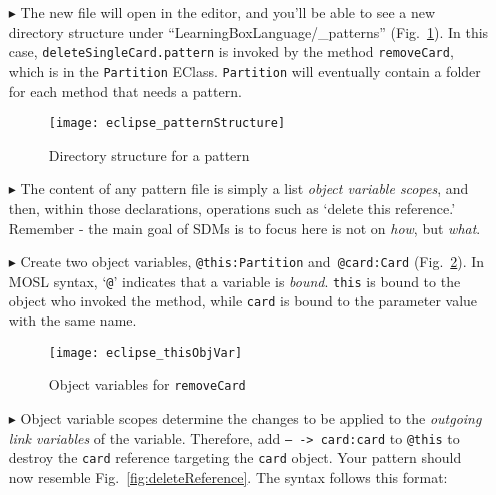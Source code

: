 \begin{itemize}
\newpage

\item[$\blacktriangleright$] The new file will open in the editor, and you'll be able to see a new directory structure under ``LearningBoxLanguage/\_patterns''
(Fig.~\ref{fig:pattStruct}). In this case, \texttt{deleteSingleCard.pattern} is invoked by the method \texttt{removeCard}, which is in the \texttt{Partition}
EClass. \texttt{Partition} will eventually contain a folder for each method that needs a pattern.

\vspace{0.5cm}

\begin{figure}[htp]
\begin{center}
  \texttt{[image: eclipse\_patternStructure]}
  \caption{Directory structure for a pattern}
  \label{fig:pattStruct}
\end{center}
\end{figure}

\item[$\blacktriangleright$] The content of any pattern file is simply a list \emph{object variable scopes}, and then,
within those declarations, operations such as `delete this reference.' Remember - the main goal of SDMs is to focus here is not on \emph{how}, but
\emph{what}.

\vspace{0.5cm}

\item[$\blacktriangleright$] Create two object variables, \texttt{@this:Partition} and~\texttt{@card:Card} (Fig.~\ref{fig:remCardObjVar}). In MOSL syntax,
`\texttt{@}' indicates that a variable is \emph{bound}. \texttt{this} is bound to the object who invoked the method, while \texttt{card} is bound to the
parameter value with the same name.

\begin{figure}[htp]
\begin{center}
  \texttt{[image: eclipse\_thisObjVar]}
  \caption{Object variables for \texttt{removeCard}}
  \label{fig:remCardObjVar}
\end{center}
\end{figure}

\clearpage

\item[$\blacktriangleright$] Object variable scopes determine the changes to be applied to the \emph{outgoing link variables} of the variable. Therefore, add
\texttt{-- -> card:card} to \texttt{@this} to destroy the \texttt{card} reference targeting the \texttt{card} object. Your pattern should now resemble
Fig.~\ref{fig:deleteReference}. The syntax follows this format:


\end{itemize}
